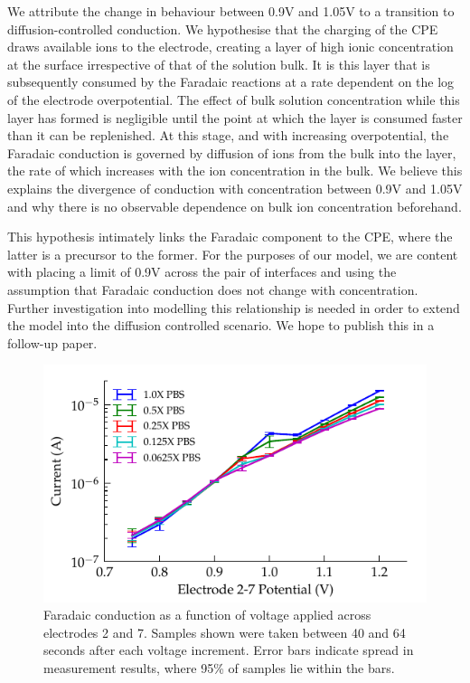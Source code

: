 \documentclass[journal, a4paper]{IEEEtran}
\begin{document}
{We attribute the change in behaviour between 0.9\thinspace V and 1.05\thinspace V to a transition to diffusion-controlled conduction.
We hypothesise that the charging of the CPE draws available ions to the electrode, creating a layer of high ionic concentration at the surface irrespective of that of the solution bulk. It is this layer that is subsequently consumed by the Faradaic reactions at a rate dependent on the log of the electrode overpotential.  The effect of bulk solution concentration while this layer has formed is negligible until the point at which the layer is consumed faster than it can be replenished. At this stage, and with increasing overpotential, the Faradaic conduction is governed by diffusion of ions from the bulk into the layer, the rate of which increases with the ion concentration in the bulk. We believe this explains the divergence of conduction with concentration between 0.9\thinspace V and 1.05\thinspace V and why there is no observable dependence on bulk ion concentration beforehand.

This hypothesis intimately links the Faradaic component to the CPE, where the latter is a precursor to the former. For the purposes of our model, we are content with placing a limit of 0.9\thinspace V across the pair of interfaces and using the assumption that Faradaic conduction does not change with concentration. Further investigation into modelling this relationship is needed in order to extend the model into the diffusion controlled scenario. We hope to publish this in a follow-up paper.

\begin{figure}
    \begin{center}
        \includegraphics{graphics/currentVoltage_logY_IEEE}
    \end{center}
    \caption{Faradaic conduction as a function of voltage applied across electrodes 2 and 7. Samples shown were taken between 40 and 64 seconds after each voltage increment. Error bars indicate spread in measurement results, where 95\% of samples lie within the bars.}
    \label{fig:faradaic_logCurrentVsVoltage}
\end{figure}

}
\end{document}

